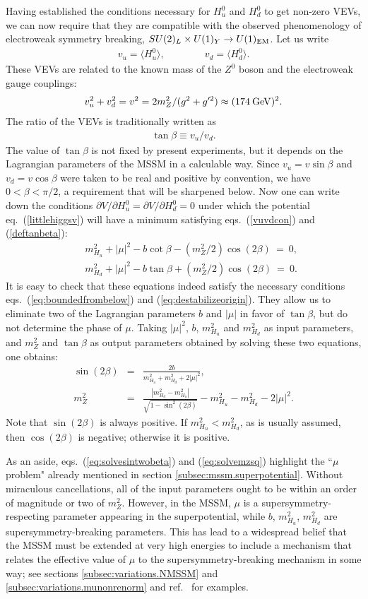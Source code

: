 \documentclass[12pt]{article}
\def\beq{\begin{eqnarray}}
\def\eeq{\end{eqnarray}}
\begin{document}
Having established the conditions necessary for $H_u^0$ and $H_d^0$ to get 
non-zero VEVs, we can now require that they are compatible with the 
observed phenomenology of electroweak symmetry breaking, $SU(2)_L \times 
U(1)_Y \rightarrow U(1)_{\rm EM}$. Let us write
\beq
v_u = \langle H_u^0\rangle,
\qquad\qquad
v_d = \langle H_d^0\rangle.
\label{defvuvd}
\eeq
These VEVs are related to the known mass of the $Z^0$ boson and the 
electroweak gauge couplings:
\beq
v_u^2 + v_d^2 = v^2 = 2 m_Z^2/(g^2 + g^{\prime 2}) \approx (174\>{\rm
GeV})^2.
\label{vuvdcon}
\eeq
The ratio of the VEVs is traditionally written as
\beq
\tan\beta \equiv v_u/v_d.
\label{deftanbeta}
\eeq
The value of $\tan\beta$ is not fixed by present experiments, but it 
depends on the Lagrangian parameters of the MSSM in a calculable way. 
Since $v_u = v \sin\beta$ and $v_d = v \cos\beta$ were taken to be real 
and positive by convention, 
we have $0 < \beta < \pi/2$, a requirement that will be 
sharpened below. Now one can write down the conditions $\partial 
V/\partial H_u^0= \partial V/\partial H_d^0 = 0$ under which the potential 
eq.~(\ref{littlehiggsv}) will have a minimum satisfying 
eqs.~(\ref{vuvdcon}) and (\ref{deftanbeta}):
\beq
&&m_{H_u}^2 + |\mu |^2 -b \cot\beta - (m_Z^2/2) \cos (2\beta) 
\>=\> 0 ,
\label{mubsub2}
\\
&&m_{H_d}^2 + |\mu |^2 -b \tan\beta + (m_Z^2/2) \cos (2\beta) \>=\> 0.
\label{mubsub1}
\eeq
It is easy to check that these equations indeed satisfy the necessary 
conditions eqs.~(\ref{eq:boundedfrombelow}) and 
(\ref{eq:destabilizeorigin}). They allow us to eliminate two of the 
Lagrangian parameters $b$ and $|\mu|$ in favor of $\tan\beta$, but do not 
determine the phase of $\mu$. Taking $|\mu|^2$, $b$, $m_{H_u}^2$ and 
$m_{H_d}^2$ as input parameters, and $m_Z^2$ and $\tan\beta$ as output 
parameters obtained by solving these two equations, one obtains:
\beq
\sin (2\beta) &=& \frac{2 b}{m^2_{H_u} + m^2_{H_d} + 2|\mu|^2},
\label{eq:solvesintwobeta}
\\
m_Z^2 &=& \frac{|m^2_{H_d} - m^2_{H_u}|}{\sqrt{1 - \sin^2(2\beta)}}
- m^2_{H_u} - m^2_{H_d} -2|\mu|^2
.
\label{eq:solvemzsq}
\eeq
Note that $\sin (2\beta)$ is always positive. If $m^2_{H_u} < m^2_{H_d}$, 
as is usually assumed, then $\cos(2\beta)$ is negative; otherwise it is 
positive.

As an aside, eqs.~(\ref{eq:solvesintwobeta}) and 
(\ref{eq:solvemzsq}) highlight the ``$\mu$ problem" already mentioned in 
section \ref{subsec:mssm.superpotential}.  Without miraculous 
cancellations, all of the input parameters ought to be within an order of 
magnitude or two of $m^2_Z$. However, in the MSSM, $\mu$ is a 
supersymmetry-respecting parameter appearing in the superpotential, while 
$b$, $m_{H_u}^2$, $m_{H_d}^2$ are supersymmetry-breaking parameters. This 
has lead to a widespread belief that the MSSM must be extended at very 
high energies to include a mechanism that relates the effective value of 
$\mu$ to the supersymmetry-breaking mechanism in some way; see sections 
\ref{subsec:variations.NMSSM} and 
\ref{subsec:variations.munonrenorm} and
ref.~\cite{muproblemGMSB} for examples.
\end{document}
